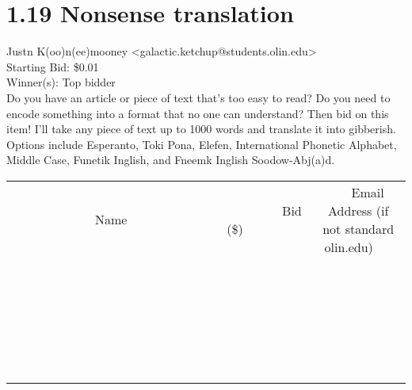 \documentclass[11pt]{article}
\begin{document}
					\section*{1.19 Nonsense translation}
					Justn K(oo)n(ee)mooney <galactic.ketchup@students.olin.edu> \\
					Starting Bid: \$0.01 \\
					Winner(s): Top bidder \\
					Do you have an article or piece of text that's too easy to read? Do you need to encode something into a format that no one can understand? Then bid on this item! I'll take any piece of text up to 1000 words and translate it into gibberish. Options include Esperanto, Toki Pona, Elefen, International Phonetic Alphabet, Middle Case, Funetik Inglish, and Fneemk Inglish Soodow-Abj(a)d. \\
					[6ex]
					\begin{tabular}{c c c}
						~~~~~~~~~~~~~Name~~~~~~~~~~~~~ & ~~~~~~~~~Bid (\$)~~~~~~~~~ & ~~~Email Address (if not standard olin.edu)~~~ \\
				
 & & \\
\hline
 & & \\
\hline
 & & \\
\hline
 & & \\
\hline
 & & \\
\hline
 & & \\
\hline
 & & \\
\hline
 & & \\
\hline
 & & \\
\hline
 & & \\
\hline
 & & \\
\hline
 & & \\
\hline
 & & \\
\hline
 & & \\
\hline
 & & \\
\hline
 & & \\
\hline
 & & \\
\hline
 & & \\
\hline
 & & \\
\hline
 & & \\
\hline
 & & \\
\hline
 & & \\
\hline
 & & \\
\hline
 & & \\
\hline
 & & \\
\hline
 & & \\
\hline
					\end{tabular}
					\clearpage
				
\end{document}
